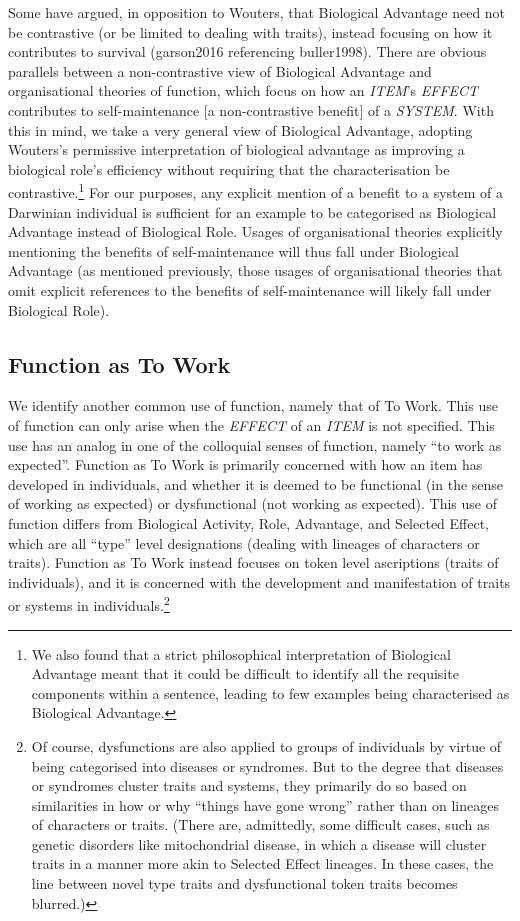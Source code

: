 \documentclass{article}
\begin{document}
Some have argued, in opposition to Wouters, that Biological Advantage need not be contrastive (or be limited to dealing with traits), instead focusing on how it contributes to survival (garson2016 referencing buller1998).
There are obvious parallels between a non-contrastive view of Biological Advantage and organisational theories of function, which focus on how an \emph{ITEM}'s \emph{EFFECT} contributes to self-maintenance [a non-contrastive benefit] of a \emph{SYSTEM}.
With this in mind, we take a very general view of Biological Advantage, adopting Wouters's permissive interpretation of biological advantage as improving a biological role's efficiency without requiring that the characterisation be contrastive.\footnote{We also found that a strict philosophical interpretation of Biological Advantage meant that it could be difficult to identify all the requisite components within a sentence, leading to few examples being characterised as Biological Advantage.}
For our purposes, any explicit mention of a benefit to a system of a Darwinian individual is sufficient for an example to be categorised as Biological Advantage instead of Biological Role.
Usages of organisational theories explicitly mentioning the benefits of self-maintenance will thus fall under Biological Advantage (as mentioned previously, those usages of organisational theories that omit explicit references to the benefits of self-maintenance will likely fall under Biological Role).

\subsection{Function as To Work}
\label{sec:funct-as-perf}

We identify another common use of function, namely that of To Work.
This use of function can only arise when the \emph{EFFECT} of an \emph{ITEM} is not specified.
This use has an analog in one of the colloquial senses of function, namely ``to work as expected''.
Function as To Work is primarily concerned with how an item has developed in individuals, and whether it is deemed to be functional (in the sense of working as expected) or dysfunctional (not working as expected).
This use of function differs from Biological Activity, Role, Advantage, and Selected Effect, which are all ``type'' level designations (dealing with lineages of characters or traits).
Function as To Work instead focuses on token level ascriptions (traits of individuals), and it is concerned with the development and manifestation of traits or systems in individuals.\footnote{Of course, dysfunctions are also applied to groups of individuals by virtue of being categorised into diseases or syndromes.
But to the degree that diseases or syndromes cluster traits and systems, they primarily do so based on similarities in how or why ``things have gone wrong'' rather than on lineages of characters or traits.
(There are, admittedly, some difficult cases, such as genetic disorders like mitochondrial disease, in which a disease will cluster traits in a manner more akin to Selected Effect lineages. In these cases, the line between novel type traits and dysfunctional token traits becomes blurred.)}
\end{document}

